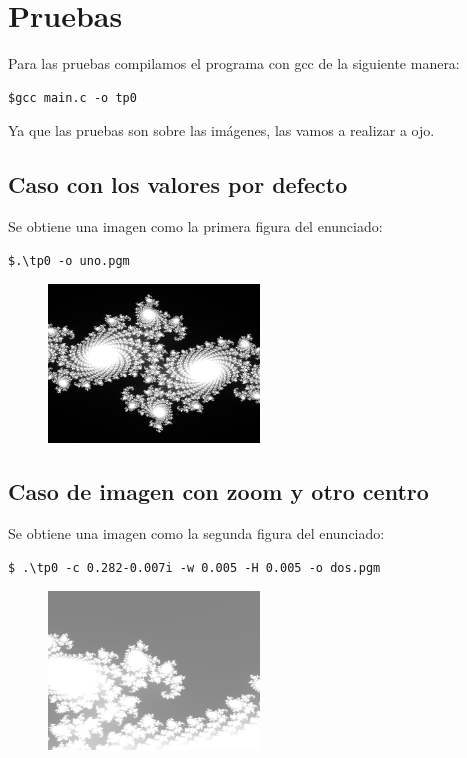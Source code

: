 \documentclass[a4paper,10pt]{article}
\begin{document}
\section{Pruebas}

Para las pruebas compilamos el programa con gcc de la siguiente manera:

\begin{lstlisting}[frame=single]
$gcc main.c -o tp0
\end{lstlisting}

Ya que las pruebas son sobre las imágenes, las vamos a realizar a ojo.

\subsection{Caso con los valores por defecto}
Se obtiene una imagen como la primera figura del enunciado:

\begin{lstlisting}[frame=single]
$.\tp0 -o uno.pgm
\end{lstlisting}

\begin{figure}[!htp]
\begin{center}
\includegraphics[width=0.5\textwidth]{uno.png}
\caption{} \label{}
\end{center}
\end{figure}

\subsection{Caso de imagen con zoom y otro centro}
Se obtiene una imagen como la segunda figura del enunciado:

\begin{lstlisting}[frame=single]
$ .\tp0 -c 0.282-0.007i -w 0.005 -H 0.005 -o dos.pgm
\end{lstlisting}

\begin{figure}[!htp]
\begin{center}
\includegraphics[width=0.5\textwidth]{dos.png}
\caption{} \label{}
\end{center}
\end{figure}
\end{document}
